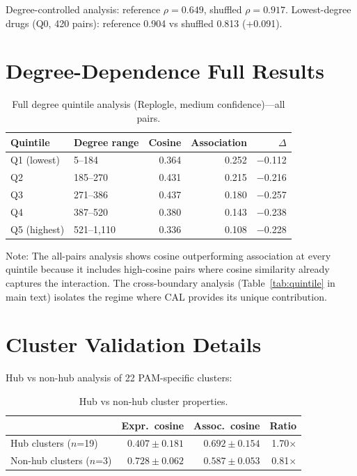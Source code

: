 \documentclass[11pt]{article}
\begin{document}
Degree-controlled analysis: reference $\rho = 0.649$, shuffled $\rho = 0.917$. Lowest-degree drugs (Q0, 420 pairs): reference 0.904 vs shuffled 0.813 (+0.091).

\section{Degree-Dependence Full Results}
\label{app:degree}

\begin{table}[h]
\centering
\caption{Full degree quintile analysis (Replogle, medium confidence)---all pairs.}
\label{tab:degree_full}
\begin{tabular}{llrrr}
\toprule
Quintile & Degree range & Cosine & Association & $\Delta$ \\
\midrule
Q1 (lowest) & 5--184 & 0.364 & 0.252 & $-$0.112 \\
Q2 & 185--270 & 0.431 & 0.215 & $-$0.216 \\
Q3 & 271--386 & 0.437 & 0.180 & $-$0.257 \\
Q4 & 387--520 & 0.380 & 0.143 & $-$0.238 \\
Q5 (highest) & 521--1{,}110 & 0.336 & 0.108 & $-$0.228 \\
\bottomrule
\end{tabular}
\end{table}

Note: The all-pairs analysis shows cosine outperforming association at every quintile because it includes high-cosine pairs where cosine similarity already captures the interaction. The cross-boundary analysis (Table~\ref{tab:quintile} in main text) isolates the regime where CAL provides its unique contribution.

\section{Cluster Validation Details}
\label{app:clusters}

Hub vs non-hub analysis of 22 PAM-specific clusters:

\begin{table}[h]
\centering
\caption{Hub vs non-hub cluster properties.}
\label{tab:hub}
\begin{tabular}{lrrr}
\toprule
 & Expr.\ cosine & Assoc.\ cosine & Ratio \\
\midrule
Hub clusters ($n$=19) & $0.407 \pm 0.181$ & $0.692 \pm 0.154$ & 1.70$\times$ \\
Non-hub clusters ($n$=3) & $0.728 \pm 0.062$ & $0.587 \pm 0.053$ & 0.81$\times$ \\
\bottomrule
\end{tabular}
\end{table}
\end{document}
